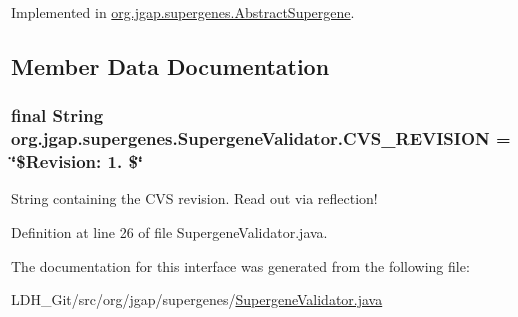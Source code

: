 Implemented in \hyperlink{classorg_1_1jgap_1_1supergenes_1_1_abstract_supergene_a70a5435dbf92b886ab7d5bbcd2d79d09}{org.\-jgap.\-supergenes.\-Abstract\-Supergene}.



\subsection{Member Data Documentation}
\hypertarget{interfaceorg_1_1jgap_1_1supergenes_1_1_supergene_validator_a5b799d0019e7300bd56fe1a2125384ad}{
\subsubsection[{C\-V\-S\-\_\-\-R\-E\-V\-I\-S\-I\-O\-N}]{\setlength{\rightskip}{0pt plus 5cm}final String org.\-jgap.\-supergenes.\-Supergene\-Validator.\-C\-V\-S\-\_\-\-R\-E\-V\-I\-S\-I\-O\-N = \char`\"{}\$Revision\-: 1. \$\char`\"{}\hspace{0.3cm}{\ttfamily [static]}}}\label{interfaceorg_1_1jgap_1_1supergenes_1_1_supergene_validator_a5b799d0019e7300bd56fe1a2125384ad}
String containing the C\-V\-S revision. Read out via reflection! 

Definition at line 26 of file Supergene\-Validator.\-java.



The documentation for this interface was generated from the following file\-:\begin{DoxyCompactItemize}
\item 
L\-D\-H\-\_\-\-Git/src/org/jgap/supergenes/\hyperlink{_supergene_validator_8java}{Supergene\-Validator.\-java}\end{DoxyCompactItemize}
